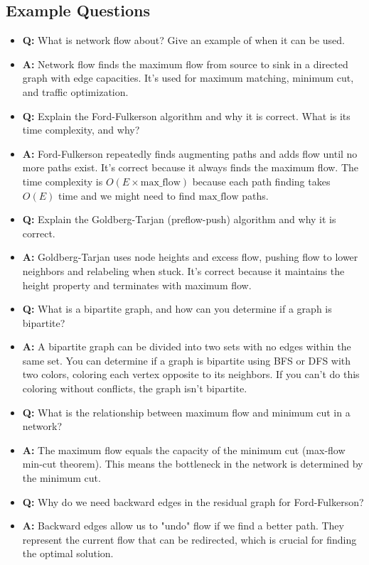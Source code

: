 \documentclass[11pt,a4paper]{article}
\begin{document}
\begin{multicols}{2}
\subsection{Example Questions}
\begin{itemize}
    \item \textbf{Q:} What is network flow about? Give an example of when it can be used.
    \item \textbf{A:} Network flow finds the maximum flow from source to sink in a directed graph with edge capacities. It's used for maximum matching, minimum cut, and traffic optimization.

    \item \textbf{Q:} Explain the Ford-Fulkerson algorithm and why it is correct. What is its time complexity, and why?
    \item \textbf{A:} Ford-Fulkerson repeatedly finds augmenting paths and adds flow until no more paths exist. It's correct because it always finds the maximum flow. The time complexity is $O(E \times \text{max\_flow})$ because each path finding takes $O(E)$ time and we might need to find $\text{max\_flow}$ paths.

    \item \textbf{Q:} Explain the Goldberg-Tarjan (preflow-push) algorithm and why it is correct.
    \item \textbf{A:} Goldberg-Tarjan uses node heights and excess flow, pushing flow to lower neighbors and relabeling when stuck. It's correct because it maintains the height property and terminates with maximum flow.

    \item \textbf{Q:} What is a bipartite graph, and how can you determine if a graph is bipartite?
    \item \textbf{A:} A bipartite graph can be divided into two sets with no edges within the same set. You can determine if a graph is bipartite using BFS or DFS with two colors, coloring each vertex opposite to its neighbors. If you can't do this coloring without conflicts, the graph isn't bipartite.

    \item \textbf{Q:} What is the relationship between maximum flow and minimum cut in a network?
    \item \textbf{A:} The maximum flow equals the capacity of the minimum cut (max-flow min-cut theorem). This means the bottleneck in the network is determined by the minimum cut.

    \item \textbf{Q:} Why do we need backward edges in the residual graph for Ford-Fulkerson?
    \item \textbf{A:} Backward edges allow us to "undo" flow if we find a better path. They represent the current flow that can be redirected, which is crucial for finding the optimal solution.


\end{itemize}
\end{multicols}
\end{document}
